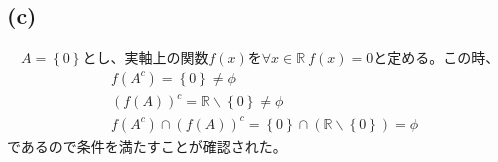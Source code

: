 \documentclass{article}
\begin{document}
\subsection{(c)}
　$A = \left\{ 0 \right\}$とし、実軸上の関数$f(x)$を$\forall x \in \mathbb{R}\ f(x) = 0$と定める。この時、
\begin{align*}
	&f\left( A^c \right) = \left\{ 0\right\} \neq \phi\\
	&\left( f\left( A \right) \right)^c = \mathbb{R}\backslash \left\{ 0 \right\} \neq \phi\\
	&f\left( A^c \right) \cap \left( f\left( A \right) \right)^c = \left\{ 0\right\} \cap \left( \mathbb{R}\backslash \left\{ 0 \right\}\right) = \phi
\end{align*}
であるので条件を満たすことが確認された。
\end{document}

